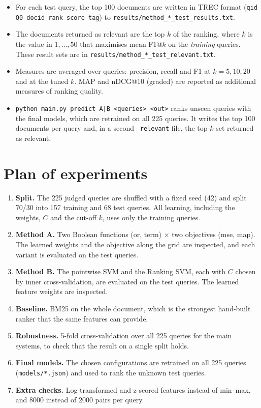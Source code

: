 \documentclass[11pt,a4paper]{article}
\newcommand{\code}[1]{\texttt{#1}}
\begin{document}
\begin{itemize}
  \item For each test query, the top 100 documents are written in TREC format
  (\code{qid Q0 docid rank score tag}) to \code{results/method\_*\_test\_results.txt}.
  \item The documents returned as relevant are the top $k$ of the ranking, where $k$ is the
  value in $1,\dots,50$ that maximises mean F1@$k$ on the \emph{training} queries. These
  result sets are in \code{results/method\_*\_test\_relevant.txt}.
  \item Measures are averaged over queries: precision, recall and F1 at $k = 5, 10, 20$ and
  at the tuned $k$. MAP and nDCG@10 (graded) are reported as additional measures of ranking
  quality.
  \item \code{python main.py predict A|B <queries> <out>} ranks unseen queries with the
  final models, which are retrained on all 225 queries. It writes the top 100 documents per
  query and, in a second \code{\_relevant} file, the top-$k$ set returned as relevant.
\end{itemize}

\section{Plan of experiments}

\begin{enumerate}
  \item \textbf{Split.} The 225 judged queries are shuffled with a fixed seed (42) and split
  70/30 into 157 training and 68 test queries. All learning, including the weights, $C$ and
  the cut-off $k$, uses only the training queries.
  \item \textbf{Method A.} Two Boolean functions (or, term) $\times$ two objectives (mse,
  map). The learned weights and the objective along the grid are inspected, and each variant
  is evaluated on the test queries.
  \item \textbf{Method B.} The pointwise SVM and the Ranking SVM, each with $C$ chosen by
  inner cross-validation, are evaluated on the test queries. The learned feature weights are
  inspected.
  \item \textbf{Baseline.} BM25 on the whole document, which is the strongest hand-built
  ranker that the same features can provide.
  \item \textbf{Robustness.} 5-fold cross-validation over all 225 queries for the main
  systems, to check that the result on a single split holds.
  \item \textbf{Final models.} The chosen configurations are retrained on all 225 queries
  (\code{models/*.json}) and used to rank the unknown test queries.
  \item \textbf{Extra checks.} Log-transformed and z-scored features instead of min--max,
  and 8000 instead of 2000 pairs per query.
\end{enumerate}
\end{document}
